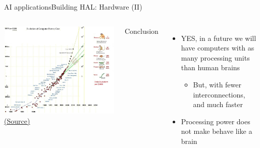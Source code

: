 \documentclass[10pt,compress]{beamer} %
\begin{document}
\begin{frame}{AI applications}{Building HAL: Hardware (II)}
	\begin{columns}
	\begin{center}
		\includegraphics[width=\linewidth]{figs/power.jpg}\\
		\tiny{\href{http://www.sjef.nu/a-basic-introduction-to-singularity-skepticism/}{(Source)}}
	\end{center}
	Conclusion
	\begin{itemize}
		\item YES, in a future we will have computers with as many processing units than human brains
		\begin{itemize}
		\item But, with fewer interconnections, and much faster
		\end{itemize}
		\item Processing power does not make behave like a brain
	\end{itemize}
	\end{columns}
\end{frame}
\end{document}

